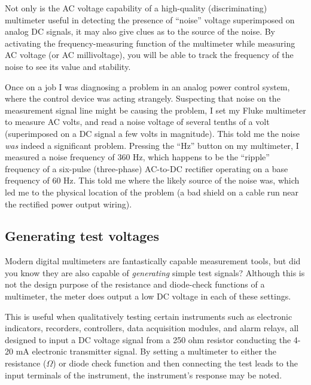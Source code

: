 Not only is the AC voltage capability of a high-quality (discriminating) multimeter useful in detecting the presence of ``noise'' voltage superimposed on analog DC signals, it may also give clues as to the source of the noise.  By activating the frequency-measuring function of the multimeter while measuring AC voltage (or AC millivoltage), you will be able to track the frequency of the noise to see its value and stability.

Once on a job I was diagnosing a problem in an analog power control system, where the control device was acting strangely.  Suspecting that noise on the measurement signal line might be causing the problem, I set my Fluke multimeter to measure AC volts, and read a noise voltage of several tenths of a volt (superimposed on a DC signal a few volts in magnitude).  This told me the noise \textit{was} indeed a significant problem.  Pressing the ``Hz'' button on my multimeter, I measured a noise frequency of 360 Hz, which happens to be the ``ripple'' frequency of a six-pulse (three-phase) AC-to-DC rectifier operating on a base frequency of 60 Hz.  This told me where the likely source of the noise was, which led me to the physical location of the problem (a bad shield on a cable run near the rectified power output wiring).








\filbreak
\subsection{Generating test voltages}

Modern digital multimeters are fantastically capable measurement tools, but did you know they are also capable of \textit{generating} simple test signals?  Although this is not the design purpose of the resistance and diode-check functions of a multimeter, the meter does output a low DC voltage in each of these settings.

This is useful when qualitatively testing certain instruments such as electronic indicators, recorders, controllers, data acquisition modules, and alarm relays, all designed to input a DC voltage signal from a 250 ohm resistor conducting the 4-20 mA electronic transmitter signal.  By setting a multimeter to either the resistance ($\Omega$) or diode check function and then connecting the test leads to the input terminals of the instrument, the instrument's response may be noted.  

